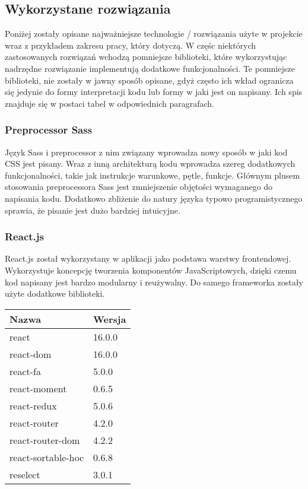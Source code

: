 \documentclass[eng,printmode]{mgr}
\begin{document}
\subsection{Wykorzystane rozwiązania}

Poniżej zostały opisane najważniejsze technologie / rozwiązania użyte w projekcie wraz z przykładem zakresu pracy, który dotyczą. W częśc niektórych zastosowanych rozwiązań wchodzą pomniejsze biblioteki, które wykorzystując nadrzędne rozwiązanie implementują dodatkowe funkcjonalności. Te pomniejsze biblioteki, nie zostały w jawny sposób opisane, gdyż często ich wkład ogranicza się jedynie do formy interpretacji kodu lub formy w jaki jest on napisany. Ich spis znajduje się w postaci tabel w odpowiednich paragrafach.

\subsubsection{Preprocessor Sass}
Język Sass i preprocessor z nim związany \cite {SASS} wprowadza nowy sposób w jaki kod CSS jest pisany. Wraz z inną architekturą kodu wprowadza szereg dodatkowych funkcjonalności, takie jak instrukcje warunkowe, pętle, funkcje. Głównym plusem stosowania preprocessora Sass jest zmniejszenie objętości wymaganego do napisania kodu. Dodatkowo zbliżenie do natury języka typowo programistycznego sprawia, że pisanie jest dużo bardziej intuicyjne.

\subsubsection{React.js}
React.js \cite {React} został wykorzystany w aplikacji jako podstawa warstwy frontendowej. Wykorzystuje koncepcję tworzenia komponentów JavaScriptowych, dzięki czemu kod napisany jest bardzo modularny i reużywalny. Do samego frameworka zostały użyte dodatkowe biblioteki.
\\
\label{Tab. 1 - Biblioteki wykorzystujące React}
\begin{tabularx}{\textwidth}{|l|l|}
  \hline
    \textbf{Nazwa} & \textbf{Wersja} \\
  \hline
    react & 16.0.0 \\
  \hline
   	react-dom & 16.0.0 \\
  \hline
  	react-fa & 5.0.0 \\
   \hline
   	react-moment & 0.6.5 \\
   \hline
  	react-redux & 5.0.6 \\
   \hline
  	react-router & 4.2.0 \\
   \hline
  	react-router-dom & 4.2.2 \\
   \hline
  	react-sortable-hoc & 0.6.8 \\
   \hline
   reselect & 3.0.1 \\
   \hline
\end{tabularx}
\end{document}
